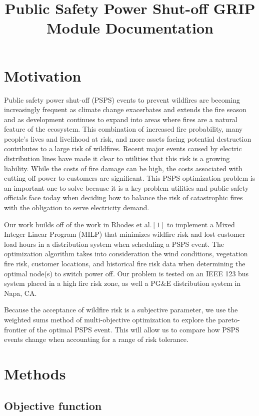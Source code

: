 \documentclass{article}
\title{Public Safety Power Shut-off GRIP Module Documentation}
\begin{document}
\maketitle

\section{Motivation}

Public safety power shut-off (PSPS) events to prevent wildfires are becoming increasingly frequent as climate change exacerbates and extends the fire season and as development continues to expand into areas where fires are a natural feature of the ecosystem. This combination of increased fire probability, many people's lives and livelihood at risk, and more assets facing potential destruction contributes to a large risk of wildfires. Recent major events caused by electric distribution lines have made it clear to utilities that this risk is a growing liability. While the costs of fire damage can be high, the costs associated with cutting off power to customers are significant. This PSPS optimization problem is an important one to solve because it is a key problem utilities and public safety officials face today when deciding how to balance the risk of catastrophic fires with the obligation to serve electricity demand. 

Our work builds off of the work in Rhodes et al.$[1]$ to implement a Mixed Integer Linear Program (MILP) that minimizes wildfire risk and lost customer load hours in a distribution system when scheduling a PSPS event. The optimization algorithm takes into consideration the wind conditions, vegetation fire risk, customer locations, and historical fire risk data when determining the optimal node(s) to switch power off. Our problem is tested on an IEEE 123 bus system placed in a high fire risk zone, as well a PG&E distribution system in Napa, CA.

Because the acceptance of wildfire risk is a subjective parameter, we use the weighted sums method of multi-objective optimization to explore the pareto-frontier of the optimal PSPS event. This will allow us to compare how PSPS events change when accounting for a range of risk tolerance.

\section{Methods}
\subsection{Objective function}
\end{document}
